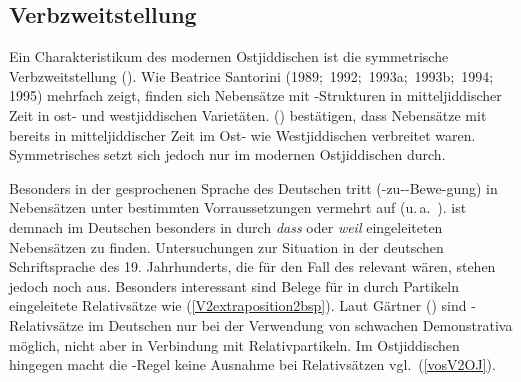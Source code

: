   


  \subsection{Verbzweitstellung}\label{v2}
Ein Charakteristikum des modernen Ostjiddischen ist die symmetrische Verbzweitstellung (). Wie Beatrice Santorini (1989;\, 1992;\, 1993a;\, 1993b;\, 1994;\, 1995) %
mehrfach zeigt, finden sich Nebensätze mit -Strukturen in mitteljiddischer Zeit in ost- und westjiddischen Varietäten. \citeauthor{KuehnertWagner2014} (\citeyear{KuehnertWagner2014}) bestätigen, dass Nebensätze mit  bereits in mitteljiddischer Zeit im Ost- wie Westjiddischen verbreitet waren. Symmetrisches  setzt sich jedoch nur im modernen Ostjiddischen durch.

Besonders in der gesprochenen Sprache  des Deutschen tritt  (-zu--Bewe-gung) in Nebensätzen unter bestimmten Vorraussetzungen vermehrt auf (u.\,a.\, \citealt{Wegener1993,Wegener1999,Guenther1993,Uhmann1998,Scheutz1998,Scheutz2001,Reis2006,Freywald2008,Freywald2009,SteinbachAntomo2010}).  ist demnach im Deutschen besonders in durch \textit{dass} oder \textit{weil} eingeleiteten Nebensätzen zu finden. Untersuchungen zur Situation in der deutschen Schriftsprache des 19. Jahrhunderts, die für den Fall des \hai{{\LiJieins}} relevant wären, stehen jedoch noch aus. Besonders interessant sind Belege für  in durch Partikeln eingeleitete Relativsätze wie (\ref{V2extraposition2bsp}). Laut Gärtner (\citeyear{Gaertner2001}) sind -Relativsätze im Deutschen nur  bei der Verwendung von schwachen Demonstrativa möglich, nicht aber in Verbindung mit Relativpartikeln. Im Ostjiddischen hingegen macht die -Regel keine Ausnahme bei Relativsätzen vgl.\, (\ref{vosV2OJ}). 

